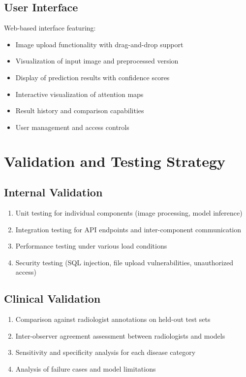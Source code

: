 {\subsection{User Interface}

Web-based interface featuring:

\begin{itemize}
    \item Image upload functionality with drag-and-drop support
    \item Visualization of input image and preprocessed version
    \item Display of prediction results with confidence scores
    \item Interactive visualization of attention maps
    \item Result history and comparison capabilities
    \item User management and access controls
\end{itemize}

\section{Validation and Testing Strategy}

\subsection{Internal Validation}

\begin{enumerate}
    \item Unit testing for individual components (image processing, model inference)
    \item Integration testing for API endpoints and inter-component communication
    \item Performance testing under various load conditions
    \item Security testing (SQL injection, file upload vulnerabilities, unauthorized access)
\end{enumerate}

\subsection{Clinical Validation}

\begin{enumerate}
    \item Comparison against radiologist annotations on held-out test sets
    \item Inter-observer agreement assessment between radiologists and models
    \item Sensitivity and specificity analysis for each disease category
    \item Analysis of failure cases and model limitations
\end{enumerate}

}
